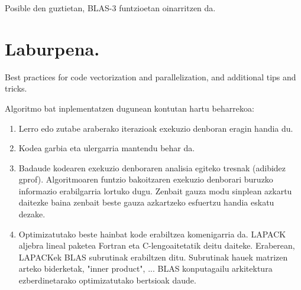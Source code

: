 Posible den guztietan, BLAS-3 funtzioetan oinarritzen da.


\section{Laburpena.}

Best practices for code vectorization and parallelization, and additional tips and tricks.

Algoritmo bat inplementatzen dugunean kontutan hartu beharrekoa:

\begin{enumerate}

\item Lerro edo zutabe araberako iterazioak exekuzio denboran eragin handia du.

\item Kodea garbia eta ulergarria mantendu behar da.

\item Badaude kodearen exekuzio denboraren analisia egiteko tresnak (adibidez gprof). Algoritmoaren funtzio bakoitzaren exekuzio denborari buruzko informazio erabilgarria lortuko dugu. Zenbait gauza modu sinplean azkartu daitezke baina zenbait beste gauza azkartzeko esfuertzu handia eskatu dezake.

\item Optimizatutako beste hainbat kode erabiltzea komenigarria da. LAPACK aljebra lineal paketea Fortran eta C-lengoaitetatik deitu daiteke. Eraberean, LAPACKek BLAS subrutinak erabiltzen ditu.  Subrutinak hauek matrizen arteko biderketak, "inner product", ... BLAS konputagailu arkitektura ezberdinetarako optimizatutako bertsioak daude.
 

\end{enumerate}

